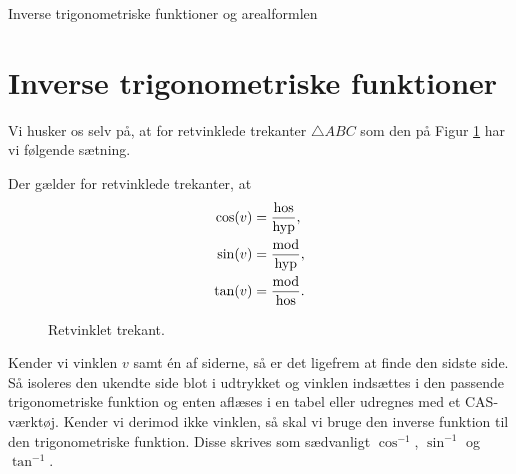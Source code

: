 \begin{center}
\Huge
	Inverse trigonometriske funktioner og arealformlen		
\end{center}

\section*{Inverse trigonometriske funktioner}

Vi husker os selv på, at for retvinklede trekanter $\triangle ABC$ som den på Figur \ref{fig:retvinklet}
har vi følgende sætning.
\begin{setn}
	Der gælder for retvinklede trekanter, at
	\begin{align*}
		\cos(v) &= \frac{\textnormal{hos}}{\textnormal{hyp}}, \\
		\sin(v) &= \frac{\textnormal{mod}}{\textnormal{hyp}}, \\
		\tan(v) &= \frac{\textnormal{mod}}{\textnormal{hos}}.
	\end{align*}
\end{setn}

\begin{figure}[H]
	\centering
	\caption{Retvinklet trekant.}
	\label{fig:retvinklet}
\end{figure}

Kender vi vinklen $v$ samt én af siderne, så er det ligefrem at finde den sidste side. Så isoleres den ukendte side blot i udtrykket og vinklen indsættes i den passende trigonometriske funktion og enten aflæses i en tabel eller udregnes med et CAS-værktøj. Kender vi derimod ikke vinklen, så skal vi bruge den inverse funktion til den trigonometriske funktion. Disse skrives som sædvanligt $\cos^{-1}$, $\sin^{-1}$ og  $\tan^{-1}$.

